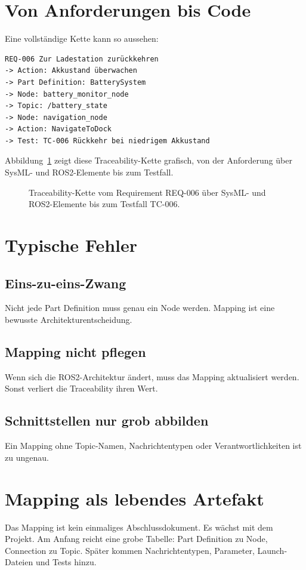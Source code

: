 \section{Von Anforderungen bis Code}
Eine vollständige Kette kann so aussehen:

\begin{lstlisting}[style=plaintext]
REQ-006 Zur Ladestation zurückkehren
-> Action: Akkustand überwachen
-> Part Definition: BatterySystem
-> Node: battery_monitor_node
-> Topic: /battery_state
-> Node: navigation_node
-> Action: NavigateToDock
-> Test: TC-006 Rückkehr bei niedrigem Akkustand
\end{lstlisting}

Abbildung~\ref{fig:kap16-traceability-batteriemanagement} zeigt diese Traceability-Kette grafisch, von der Anforderung über SysML- und ROS2-Elemente bis zum Testfall.

\begin{figure}[H]
  \centering
  \caption{Traceability-Kette vom Requirement REQ-006 über SysML- und ROS2-Elemente bis zum Testfall TC-006.}
  \label{fig:kap16-traceability-batteriemanagement}
\end{figure}

\section{Typische Fehler}
\subsection{Eins-zu-eins-Zwang}
Nicht jede Part Definition muss genau ein Node werden. Mapping ist eine bewusste Architekturentscheidung.

\subsection{Mapping nicht pflegen}
Wenn sich die ROS2-Architektur ändert, muss das Mapping aktualisiert werden. Sonst verliert die Traceability ihren Wert.

\subsection{Schnittstellen nur grob abbilden}
Ein Mapping ohne Topic-Namen, Nachrichtentypen oder Verantwortlichkeiten ist zu ungenau.

\section{Mapping als lebendes Artefakt}
Das Mapping ist kein einmaliges Abschlussdokument. Es wächst mit dem Projekt. Am Anfang reicht eine grobe Tabelle: Part Definition zu Node, Connection zu Topic. Später kommen Nachrichtentypen, Parameter, Launch-Dateien und Tests hinzu.

